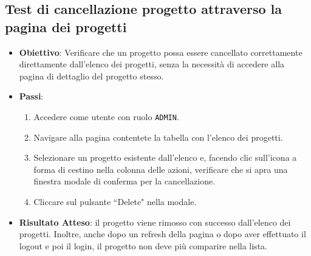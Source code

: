\documentclass[target=bach,aauheader=,style=]{thud}
\begin{document}
\subsection{Test di cancellazione progetto attraverso la pagina dei progetti}
\begin{itemize}
    \item \textbf{Obiettivo}: Verificare che un progetto possa essere cancellato correttamente direttamente dall'elenco dei progetti, senza la necessità di accedere alla pagina di dettaglio del progetto stesso.
    \item \textbf{Passi}:
    \begin{enumerate}
        \item Accedere come utente con ruolo \texttt{ADMIN}.
        \item Navigare alla pagina contentete la tabella con l'elenco dei progetti.
        \item Selezionare un progetto esistente dall'elenco e, facendo clic sull'icona a forma di cestino nella colonna delle azioni, verificare che si apra una finestra modale di conferma per la cancellazione.
        \item Cliccare sul pulsante ``Delete" nella modale.
    \end{enumerate}
    \item \textbf{Risultato Atteso}: il progetto viene rimosso con successo dall'elenco dei progetti. Inoltre, anche dopo un refresh della pagina o dopo aver effettuato il logout e poi il login, il progetto non deve più comparire nella lista.
\end{itemize}
\end{document}

